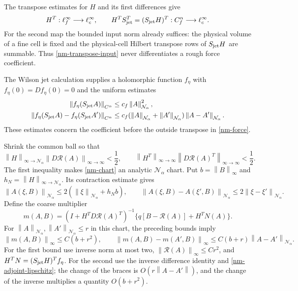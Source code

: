 \documentclass[11pt]{article}
\theoremstyle{remark}
\newcommand{\norm}[1]{\left\|#1\right\|}
\begin{document}
The transpose estimates for $H$ and its first differences give
\begin{equation}\label{nm-transpose-input}
 H^T:\ell^\infty_f\longrightarrow\ell^\infty_c,
 \qquad H^TS_{\rm jet}^T=(S_{\rm jet}H)^T:
       C^\alpha_f\longrightarrow\ell^\infty_c.
\end{equation}
For the second map the bounded input norm already suffices:
the physical volume of a fine cell is fixed and the physical-cell
Hilbert transpose rows of $S_{\rm jet}H$ are summable. Thus
\eqref{nm-transpose-input} never differentiates a rough force
coefficient.

The Wilson jet calculation supplies a holomorphic function
$f_\eta$ with $f_\eta(0)=Df_\eta(0)=0$ and the uniform estimates
\begin{align}
 \norm{f_\eta(S_{\rm jet}A)}_{C^\alpha}
 &\le c_f\norm{A}_{\mathcal N_\alpha}^2,                 \label{nm-force-bound}\\
 \norm{f_\eta(S_{\rm jet}A)-f_\eta(S_{\rm jet}A')}_{C^\alpha}
 &\le c_f(\norm{A}_{\mathcal N_\alpha}+
           \norm{A'}_{\mathcal N_\alpha})
                 \norm{A-A'}_{\mathcal N_\alpha}.        \label{nm-force-lipschitz}
\end{align}
These estimates concern the coefficient before the outside
transpose in \eqref{nm-force}.

Shrink the common ball so that
\begin{equation}\label{nm-neumann-smallness}
 \norm{H}_{\infty\to\mathcal N_\alpha}
       \norm{D\mathcal R(A)}_{\infty\to\infty}<\frac12,
 \qquad
 \norm{H^T}_{\infty\to\infty}
       \norm{D\mathcal R(A)^T}_{\infty\to\infty}<\frac12.
\end{equation}
The first inequality makes \eqref{nm-chart} an analytic
$\mathcal N_\alpha$ chart. Put $b=\norm{B}_\infty$ and
$h_N=\norm{H}_{\infty\to\mathcal N_\alpha}$. Its contraction
estimate gives
\begin{equation}\label{nm-chart-estimates}
 \norm{A(\xi,B)}_{\mathcal N_\alpha}
 \le2(\norm{\xi}_{\mathcal N_\alpha}+h_Nb),\qquad
 \norm{A(\xi,B)-A(\xi',B)}_{\mathcal N_\alpha}
 \le2\norm{\xi-\xi'}_{\mathcal N_\alpha}.
\end{equation}
Define the coarse multiplier
\begin{equation}\label{nm-multiplier}
 m(A,B)=(I+H^TD\mathcal R(A)^T)^{-1}
             \{q[B-\mathcal R(A)]+H^TN(A)\}.
\end{equation}
For $\norm{A}_{\mathcal N_\alpha},\norm{A'}_{\mathcal N_\alpha}\le r$
in this chart, the preceding bounds imply
\begin{equation}\label{nm-multiplier-bounds}
 \norm{m(A,B)}_\infty\le C(b+r^2),\qquad
 \norm{m(A,B)-m(A',B)}_\infty
 \le C(b+r)\norm{A-A'}_{\mathcal N_\alpha}.
\end{equation}
For the first bound use inverse norm at most two,
$\norm{\mathcal R(A)}_\infty\le Cr^2$, and
$H^TN=(S_{\rm jet}H)^Tf_\eta$. For the second use the inverse
difference identity and \eqref{nm-adjoint-lipschitz}; the change
of the braces is $O(r\norm{A-A'})$, and the change of the inverse
multiplies a quantity $O(b+r^2)$.
\end{document}
